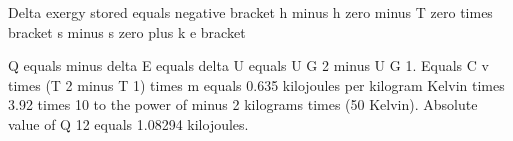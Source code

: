 Delta exergy stored equals negative bracket h minus h zero minus T zero times bracket s minus s zero plus k e bracket

Q equals minus delta E equals delta U equals U G 2 minus U G 1.  
Equals C v times (T 2 minus T 1) times m equals 0.635 kilojoules per kilogram Kelvin times 3.92 times 10 to the power of minus 2 kilograms times (50 Kelvin).  
Absolute value of Q 12 equals 1.08294 kilojoules.